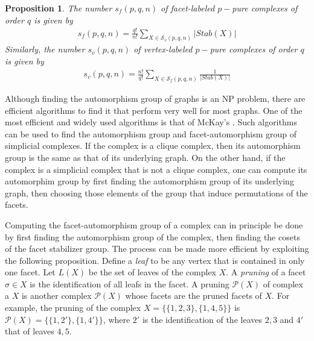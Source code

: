 \documentclass[12pt]{article}
\theoremstyle{plain}
\newtheorem{prop}[thm]{Proposition}
\theoremstyle{definition}
\theoremstyle{remark}
\begin{document}

\begin{prop}
    The number $s_f(p,q,n)$ of facet-labeled $p-$pure complexes of order $q$ is given by 
    \begin{align}
        s_f(p,q,n)=\frac{q!}{n!}\sum_{X\in\mathcal{S}_v(p,q,n)}|Stab(X)|
    \end{align}
    Similarly, the number $s_v(p,q,n)$ of vertex-labeled $p-$pure complexes of order $q$ is given by 
    \begin{align}
        s_v(p,q,n)=\frac{n!}{q!}\sum_{X\in\mathcal{S}_f(p,q,n)}\frac{1}{|Stab(X)|}
    \end{align}
\end{prop}


Although finding the automorphism group of graphs is an NP problem, there are efficient algorithms to find it that perform very well for most graphs. One of the most efficient and widely used algorithms is that of McKay's \cite{mckay2014practical}. Such algorithms can be used to find the automorphism group and facet-automorphism group of simplicial complexes. If the complex is a clique complex, then its automorphism group is the same as that of its underlying graph. On the other hand, if the complex is a simplicial complex that is not a clique complex, one can compute its automorphim group by first finding the automorphism group of its underlying graph, then choosing those elements of the group that induce permutations of the facets.

Computing the facet-automorphism group of a complex can in principle be done by first finding the automorphism group of the complex, then finding the cosets of the facet stabilizer group. The process can be made more efficient by exploiting the following proposition. Define a {\em leaf} to be any vertex that is contained in only one facet. Let $L(X)$ be the set of leaves of the complex $X$. A {\em pruning} of a facet $\sigma\in X$ is the identification of all leafs in the facet. A pruning $\mathcal{P}(X)$ of complex a $X$ is another complex $\mathcal{P}(X)$ whose facets are the pruned facets of $X$. For example, the pruning of the complex $X=\{\{1,2,3\},\{1,4,5\}\}$ is $\mathcal{P}(X)=\{\{1,2'\},\{1,4'\}\}$, where $2'$ is the identification of the leaves $2,3$ and $4'$ that of leaves $4,5$.
\end{document}

